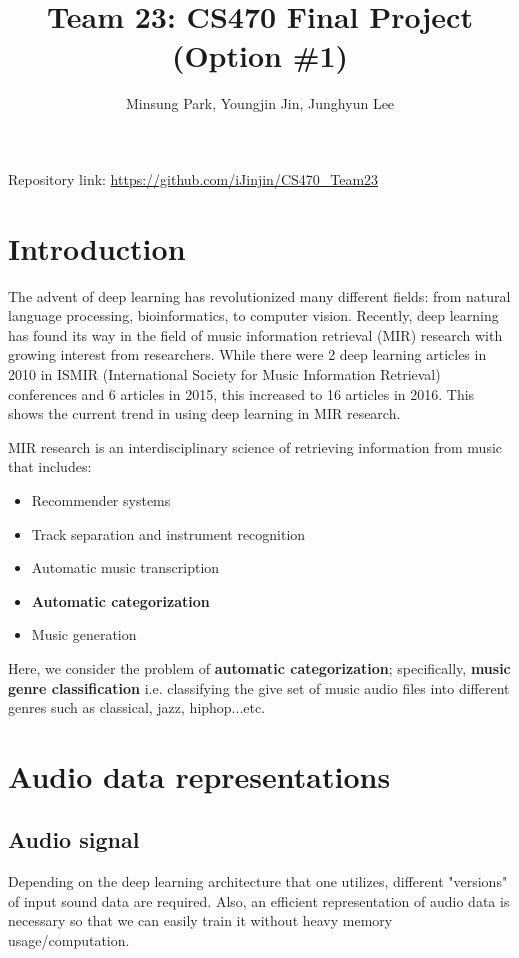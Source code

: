 \documentclass{article}
\title{Team 23: CS470 Final Project (Option \#1)}
\author{Minsung Park, Youngjin Jin, Junghyun Lee}
\theoremstyle{plain}
\theoremstyle{definition}
\theoremstyle{remark}
\begin{document}
\maketitle

Repository link: \url{https://github.com/iJinjin/CS470_Team23}

\section{Introduction}

	The advent of deep learning has revolutionized many different fields: from natural language processing, bioinformatics, to computer vision.
	Recently, deep learning has found its way in the field of music information retrieval (MIR) research with growing interest from researchers.
	While there were 2 deep learning articles in 2010 in ISMIR (International Society for Music Information Retrieval) conferences and 6 articles in 2015, this increased to 16 articles in 2016. This shows the current trend in using deep learning in MIR research.
	
	MIR research is an interdisciplinary science of retrieving information from music that includes:
\begin{itemize}
	\item Recommender systems
	\item Track separation and instrument recognition
	\item Automatic music transcription
	\item {\bf Automatic categorization}
	\item Music generation
\end{itemize}	
	Here, we consider the problem of {\bf automatic categorization}; specifically, {\bf music genre classification} i.e. classifying the give set of music audio files into different genres such as classical, jazz, hiphop...etc.
	

\section{Audio data representations}

\subsection{Audio signal}
	Depending on the deep learning architecture that one utilizes, different "versions" of input sound data are required.
	Also, an efficient representation of audio data is necessary so that we can easily train it without heavy memory usage/computation.
	
\end{document}
